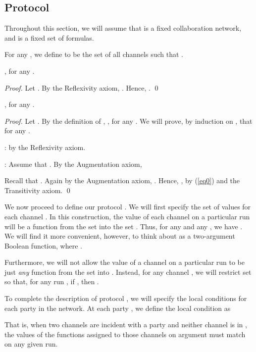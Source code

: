 \documentclass{llncs}
\begin{document}
\subsection{Protocol }
Throughout this section, we will assume that  is a fixed collaboration network, and  is a fixed set of formulas.

\begin{definition}\label{control closure}
For any , we define  to be the set of all channels  such that .
\end{definition}



\begin{theorem}\label{AsubA*}
, for any .
\end{theorem}
\begin{proof}
Let . By the Reflexivity axiom, . Hence, .
\qed \end{proof}

\begin{theorem}\label{ArhdA*}
, for any .
\end{theorem}
\begin{proof}
Let . By the definition of ,  , for any . We will
prove, by induction on , that  for any . 

:  by the Reflexivity axiom.

: Assume that . By the Augmentation axiom, 

Recall that . Again by the Augmentation axiom, .
Hence, , by (\ref{eq0}) and the Transitivity axiom.
\qed \end{proof}

We now proceed to define our protocol .  We will first specify the set of values  for each channel .  In this construction, the value of each channel  on a particular run will be a function from the set  into the set . 
Thus, for any  and any , we have . 
We will find it more convenient, however, to think about  as a two-argument Boolean function, where . 

Furthermore, we will not allow the value of a channel on a particular run to be just {\it any} function from the set  into .  Instead, for any channel , we will restrict set  so that, for any run , if , then . 


To complete the description of protocol , we will specify the local conditions for each party in the network.
At each party , we define the local condition  as

That is, when two channels are incident with a party  and neither channel is in , the values of the functions assigned to those channels on argument  must match on any given run.
\end{document}

